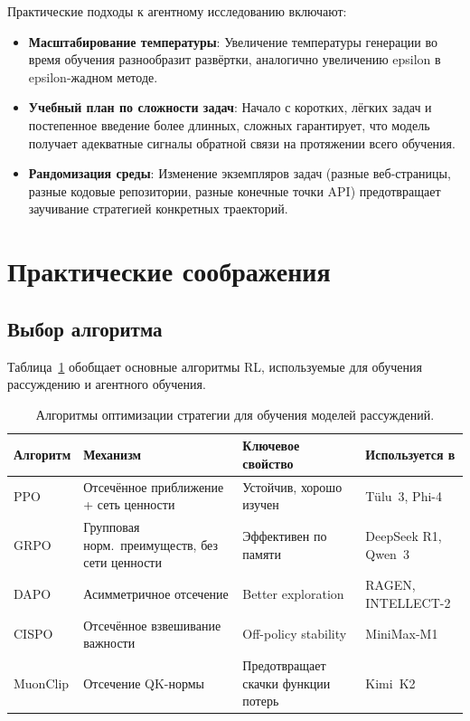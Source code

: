 Практические подходы к агентному исследованию включают:

\begin{itemize}[leftmargin=*]
\item \textbf{Масштабирование температуры}: Увеличение температуры генерации
  во время обучения разнообразит развёртки, аналогично увеличению
  epsilon в epsilon-жадном методе.

\item \textbf{Учебный план по сложности задач}: Начало с коротких,
  лёгких задач и постепенное введение более длинных, сложных гарантирует,
  что модель получает адекватные сигналы обратной связи на протяжении всего обучения.

\item \textbf{Рандомизация среды}: Изменение экземпляров задач
  (разные веб-страницы, разные кодовые репозитории, разные конечные точки API)
  предотвращает заучивание стратегией конкретных траекторий.
\end{itemize}

\section{Практические соображения}
\label{sec:practical-reasoning}

\subsection{Выбор алгоритма}
\label{subsec:algorithm-choices}

Таблица~\ref{tab:reasoning-algorithms} обобщает основные алгоритмы RL,
используемые для обучения рассуждению и агентного обучения.

\begin{table}[ht]
\centering
\footnotesize
\caption{Алгоритмы оптимизации стратегии для обучения моделей рассуждений.}
\label{tab:reasoning-algorithms}
\begin{tabular}{@{}lp{3.5cm}p{2.5cm}p{2.5cm}@{}}
\toprule
\textbf{Алгоритм} & \textbf{Механизм} & \textbf{Ключевое свойство}
  & \textbf{Используется в} \\
\midrule
PPO & Отсечённое приближение + сеть ценности
  & Устойчив, хорошо изучен & Tülu~3, Phi-4 \\
GRPO & Групповая норм.\  преимуществ, без сети ценности
  & Эффективен по памяти & DeepSeek R1, Qwen~3 \\
DAPO & Асимметричное отсечение
  & Better exploration & RAGEN, INTELLECT-2 \\
CISPO & Отсечённое взвешивание важности
  & Off-policy stability & MiniMax-M1 \\
MuonClip & Отсечение QK-нормы
  & Предотвращает скачки функции потерь & Kimi~K2 \\
\bottomrule
\end{tabular}
\end{table}

